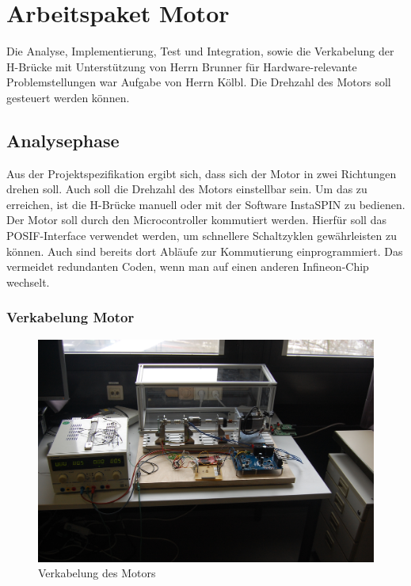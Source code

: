 
\chapter{Arbeitspaket Motor}
Die Analyse, Implementierung, Test und Integration, sowie die Verkabelung der H-Brücke mit Unterst\"utzung von Herrn Brunner f\"ur Hardware-relevante Problemstellungen war Aufgabe von Herrn Kölbl. Die Drehzahl des Motors soll gesteuert werden können.

\section{Analysephase}
Aus der Projektspezifikation ergibt sich, dass sich der Motor in zwei Richtungen drehen soll. Auch soll die Drehzahl des Motors einstellbar sein. Um das zu erreichen, ist die H-Brücke manuell oder mit der Software InstaSPIN zu bedienen. Der Motor soll durch den Microcontroller kommutiert werden. Hierfür soll das POSIF-Interface verwendet werden, um schnellere Schaltzyklen gewährleisten zu können. Auch sind bereits dort Abläufe zur Kommutierung einprogrammiert. Das vermeidet redundanten Coden, wenn man auf einen anderen Infineon-Chip wechselt.

\subsection{Verkabelung Motor}
\begin{figure}
    \includegraphics[width=\textwidth]{motor/MotorWiring.JPG}
    \caption{Verkabelung des Motors}
    \label{fig:MotorWiring}
\end{figure}

